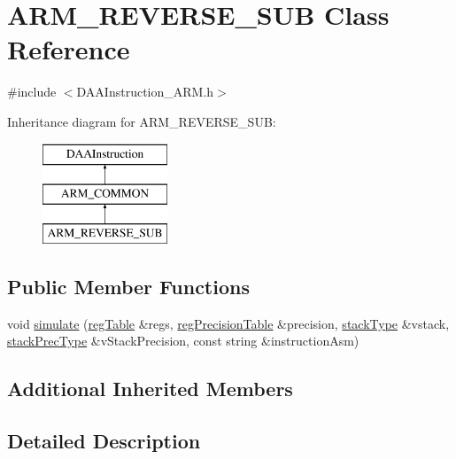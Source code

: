 \hypertarget{classARM__REVERSE__SUB}{}\section{A\+R\+M\+\_\+\+R\+E\+V\+E\+R\+S\+E\+\_\+\+S\+UB Class Reference}
\label{classARM__REVERSE__SUB}


{\ttfamily \#include $<$D\+A\+A\+Instruction\+\_\+\+A\+R\+M.\+h$>$}

Inheritance diagram for A\+R\+M\+\_\+\+R\+E\+V\+E\+R\+S\+E\+\_\+\+S\+UB\+:\begin{figure}[H]
\begin{center}
\leavevmode
\includegraphics[height=3.000000cm]{classARM__REVERSE__SUB}
\end{center}
\end{figure}
\subsection*{Public Member Functions}
\begin{DoxyCompactItemize}
\item 
void \hyperlink{classARM__REVERSE__SUB_a0606f63f3d08541627b5758675ca052c}{simulate} (\hyperlink{DAAInstruction_8h_af0fae93a861de9cf37988d5673cac523}{reg\+Table} \&regs, \hyperlink{DAAInstruction_8h_a0e8cae02815a5f8adc750122d790b455}{reg\+Precision\+Table} \&precision, \hyperlink{DAAInstruction_8h_a1b0e70ac1a04f06c8132055ed01f589f}{stack\+Type} \&vstack, \hyperlink{DAAInstruction_8h_ac5cb793e9dac3fa9693da78b7e29ab30}{stack\+Prec\+Type} \&v\+Stack\+Precision, const string \&instruction\+Asm)
\end{DoxyCompactItemize}
\subsection*{Additional Inherited Members}


\subsection{Detailed Description}


